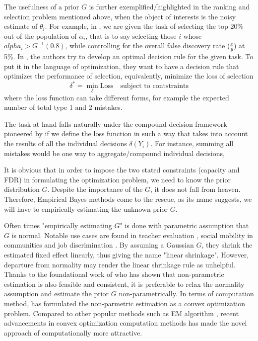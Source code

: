 \documentclass[12pt]{article}
\begin{document}
The usefulness of a prior $G$ is further exemplified/highlighted in the ranking
and selection problem mentioned above, when the object of interests is the
noisy estimate of $\theta_i$. For example, in \cite{gu2023invidious}, we are
given the task of selecting the top 20\% out of the population of $\alpha_i$,
that is to say selecting those $i$ whose $alpha_i>G^{-1}(0.8)$, while
controlling for the overall false discovery rate ($\frac{x}{y}$) at 5\%. In
\cite{gu2023invidious}, the authors try to develop an optimal decision rule for
the given task. To put it in the language of optimization, they want to have a
decision rule that optimizes the performance of selection, equivalently,
minimize the loss of selection
\begin{equation*}
    \delta^* = \min_{\delta} \text{Loss} \quad \text{subject to contstraints}
\end{equation*}
where the loss function can take different forms, for example the
expected number of total type 1 and 2 mistakes.

The task at hand falls naturally under the compound decision framework
pioneered by \cite{herbert1956empirical} if we define the loss function in such
a way that takes into account the results of all the individual decisions
$\delta(Y_i)$. For instance, summing all mistakes would be one way to
aggregate/compound individual decisions,

It is obvious that in order to impose the two stated constraints (capacity and
FDR) in formulating the optimization problem, we need to know the prior
distribution $G$. Despite the importance of the $G$, it does not fall from
heaven. Therefore, Empirical Bayes methods come to the rescue, as its name
suggests, we will have to empirically estimating the unknown prior $G$.

Often times "empirically estimating \(G\)" is done with parametric assumption
that \(G\) is normal. Notable use cases are found in teacher evaluation
\cite{chetty2014measuring}, social mobility in communities
\cite{chetty2018impacts} and job discrimination \cite{kline2021reasonable}. By
assuming a Gaussian $G$, they shrink the estimated fixed effect linearly, thus
giving the name "linear shrinkage". However, departure from normality may
render the linear shrinkage rule as unhelpful. Thanks to the foundational work
of \cite{kiefer1956consistency} who has shown that non-parametric estimation is
also feasible and consistent, it is preferable to relax the normality
assumption and estimate the prior $G$ non-parametrically. In terms of
computation method, \cite{koenker2014convex} has formulated the non-parmetric
estimation as a convex optimization problem. Compared to other popular methods
such as EM algorithm \cite{laird1978nonparametric}, recent advancements in
convex optimization computation methods \cite{andersen2010mosek} has made the
novel approach of \cite{koenker2014convex} computationally more attractive.
\end{document}
